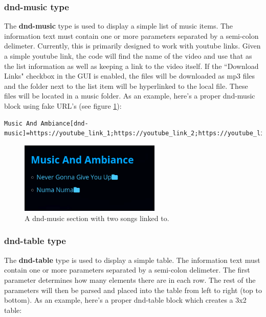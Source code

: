 \subsubsection{dnd-music type}

The \textbf{dnd-music} type is used to display a simple list of music items. The information text must contain one or more parameters separated by a semi-colon delimeter. Currently, this is primarily designed to work with youtube links. Given a simple youtube link, the code will find the name of the video and use that as the list information as well as keeping a link to the video itself. If the ``Download Links" checkbox in the GUI is enabled, the files will be downloaded as mp3 files and the folder next to the list item will be hyperlinked to the local file. These files will be located in a music folder. As an example, here's a proper dnd-music block using fake URL's (see figure \ref{fig:dnd-music-fig}):

\begin{lstlisting}
Music And Ambiance[dnd-music]=https://youtube_link_1;https://youtube_link_2;https://youtube_link_3
\end{lstlisting}

\begin{figure}[h]
	\centering
	\includegraphics[width=0.6\textwidth]{images/dnd-music-section.png}
	\caption{A dnd-music section with two songs linked to.}
	\label{fig:dnd-music-fig}
\end{figure}


\subsubsection{dnd-table type}

The \textbf{dnd-table} type is used to display a simple table. The information text must contain one or more parameters separated by a semi-colon delimeter. The first parameter determines how many elements there are in each row. The rest of the parameters will then be parsed and placed into the table from left to right (top to bottom). As an example, here's a proper dnd-table block which creates a 3x2 table:


